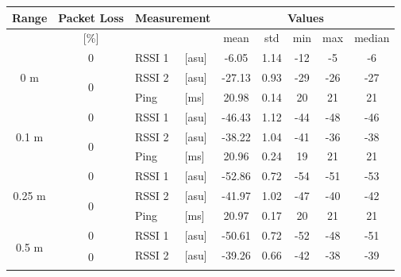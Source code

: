 \begin{table}[H]
    \centering
    \begin{tabular}{|c|c|l|l|c|c|c|c|c|}
    \hline
        Range & Packet Loss & \multicolumn{2}{l|}{Measurement} & \multicolumn{5}{c|}{Values} \\\hline
        [meters] & [\%] & \multicolumn{2}{l|}{} & mean & std & min & max & median \\\hline\hline
        \multirow{3}{*}{0 m} & \multirow{1}{*}{0} & RSSI 1 & [asu] & -6.05 & 1.14 & -12 & -5 & -6 \\\cline{2-9}\cline{2-9}
        & \multirow{2}{*}{0} & RSSI 2 & [asu] & -27.13 & 0.93 & -29 & -26 & -27 \\\cline{3-9}
        && Ping & [ms] & 20.98 & 0.14 & 20 & 21 & 21 \\\hline\hline
        \multirow{3}{*}{0.1 m} & \multirow{1}{*}{0} & RSSI 1 & [asu] & -46.43 & 1.12 & -44 & -48 & -46 \\\cline{2-9}\cline{2-9}
        & \multirow{2}{*}{0} & RSSI 2 & [asu] & -38.22 & 1.04 & -41 & -36 & -38 \\\cline{3-9}
        && Ping & [ms] & 20.96 & 0.24 & 19 & 21 & 21 \\\hline\hline
        \multirow{3}{*}{0.25 m} & \multirow{1}{*}{0} & RSSI 1 & [asu] & -52.86 & 0.72 & -54 & -51 & -53 \\\cline{2-9}\cline{2-9}
        & \multirow{2}{*}{0} & RSSI 2 & [asu] & -41.97 & 1.02 & -47 & -40 & -42 \\\cline{3-9}
        && Ping & [ms] & 20.97 & 0.17 & 20 & 21 & 21 \\\hline\hline
        \multirow{3}{*}{0.5 m} & \multirow{1}{*}{0} & RSSI 1 & [asu] & -50.61 & 0.72 & -52 & -48 & -51 \\\cline{2-9}\cline{2-9}
        & \multirow{2}{*}{0} & RSSI 2 & [asu] & -39.26 & 0.66 & -42 & -38 & -39 \\\cline{3-9}

\end{tabular}
\end{table}
